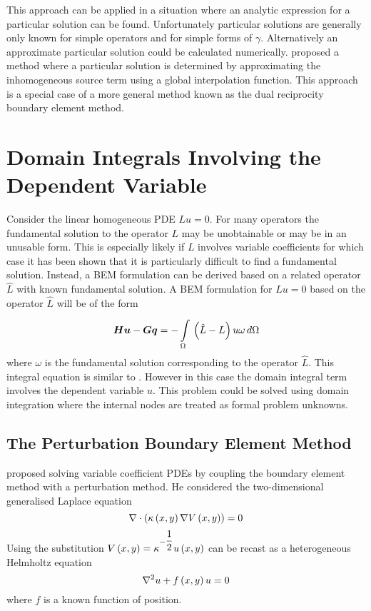 This approach can be applied in a situation where an analytic expression
for a particular solution can be found.  Unfortunately particular solutions
are generally only known for simple operators and for simple forms of
$\gamma$.  Alternatively an approximate particular solution could be
calculated numerically.   proposed a method
where a particular solution is determined by approximating the
inhomogeneous source term using a global interpolation function.  This
approach is a special case of a more general method known as the dual
reciprocity boundary element method.

\section{Domain Integrals Involving the Dependent Variable}

Consider the linear homogeneous PDE $Lu = 0$.  For many operators the
fundamental solution to the operator $L$ may be unobtainable or may be in
an unusable form.  This is especially likely if $L$ involves variable
coefficients for which case it has been shown that it is particularly
difficult to find a fundamental solution.  Instead, a BEM formulation can
be derived based on a related operator $\hat{L}$ with known fundamental
solution.  A BEM formulation for $Lu = 0$ based on the operator $\hat{L}$
will be of the form
\begin{equation}
  \matr{H} \vect{u} - \matr{G} \vect{q} 
            = -\goneint{\pbrac{\hat{L} - L} u \omega}{\Omega}
\label{eq:relate}
\end{equation}
where $\omega$ is the fundamental solution corresponding to the operator 
$\hat{L}$. This integral equation is similar to .  
However in this case the domain integral term involves the dependent
variable $u$.  This problem could be solved using domain integration where
the internal nodes are treated as formal problem unknowns. 

\subsection{The Perturbation Boundary Element Method}

 proposed solving variable coefficient PDEs by
coupling the boundary element method with a perturbation method. He
considered the two-dimensional generalised Laplace equation
\begin{equation}
  \nabla \cdot \left(   \kappa\left( x,y \right) \nabla V\left( x,y \right)   \right) = 0
\label{eq:rangge2}
\end{equation}
Using the substitution $ V\left( x,y \right)  = \kappa^{-\dfrac{1}{2}}  u\left( x,y \right) $
 can be recast as a heterogeneous Helmholtz equation
\begin{equation}
  \nabla^{2} {u} +  f\left( x,y \right) u = 0
\label{eq:varhelm2}
\end{equation}
where $f$ is a known function of position.

